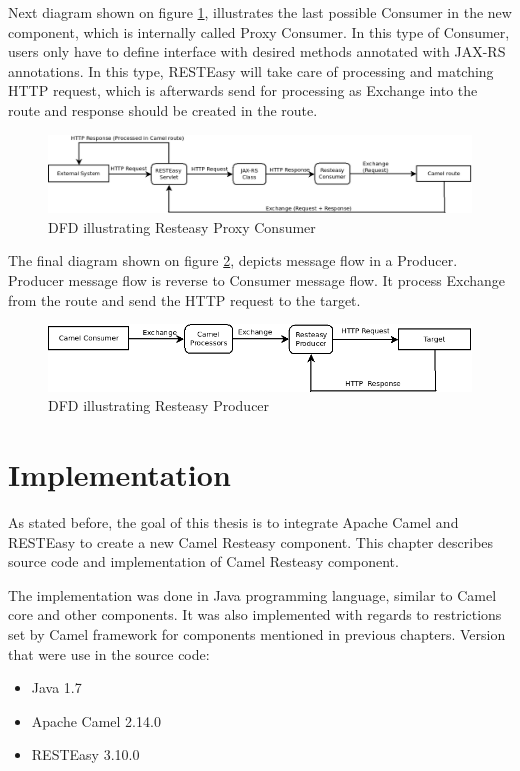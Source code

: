 \documentclass[12pt,final,oneside]{fithesis2}
\begin{document}
Next diagram shown on figure \ref{dfd-proxy}, illustrates the last possible Consumer in the new component, which is internally called Proxy Consumer. In this type of Consumer, users only have to define interface with desired methods annotated with JAX-RS annotations. In this type, RESTEasy will take care of processing and matching HTTP request, which is afterwards send for processing as Exchange into the route and response should be created in the route.  

\begin{figure}[h]
\advance\leftskip-2cm
\includegraphics[width=1.3\linewidth]{diagrams/proxy.png}
\caption{DFD illustrating Resteasy Proxy Consumer}
\label{dfd-proxy}
\end{figure}

The final diagram shown on figure \ref{dfd-prod}, depicts message flow in a Producer. Producer message flow is reverse to Consumer message flow. It process Exchange from the route and send the HTTP request to the target. 

\begin{figure}[h]
\advance\leftskip-1cm
\includegraphics[width=1.1\linewidth]{diagrams/producer.png}
\caption{DFD illustrating Resteasy Producer}
\label{dfd-prod}
\end{figure}


\chapter{Implementation}\label{impl}
As stated before, the goal of this thesis is to integrate Apache Camel and RESTEasy to create a new Camel Resteasy component. This chapter describes source code and implementation of Camel Resteasy component. 

The implementation was done in Java programming language, similar to Camel core and other components. It was also implemented with regards to restrictions set by Camel framework for components mentioned in previous chapters. Version that were use in the source code:
\begin{itemize}
\item
Java 1.7

\item
Apache Camel 2.14.0

\item
RESTEasy 3.10.0
\end{itemize}
\end{document}
